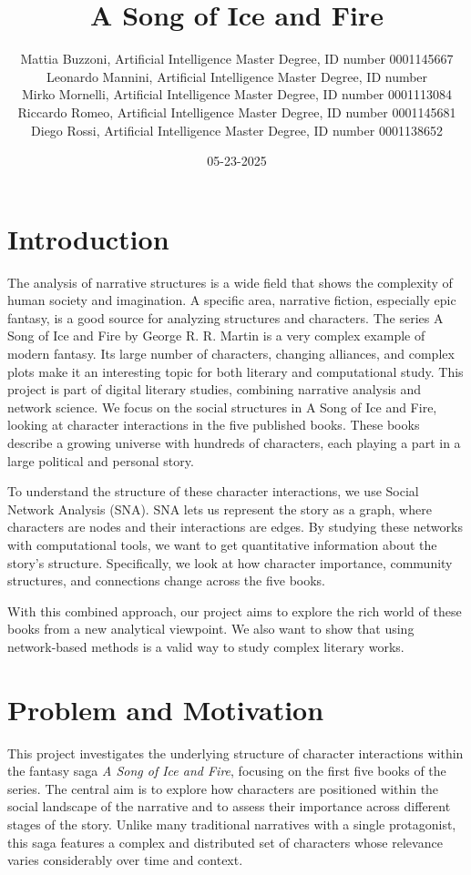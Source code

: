 \documentclass[12pt, a4paper]{article}
\author{Mattia Buzzoni, Artificial Intelligence Master Degree, ID number 0001145667
\\Leonardo Mannini, Artificial Intelligence Master Degree, ID number 
\\Mirko Mornelli, Artificial Intelligence Master Degree, ID number 0001113084
\\Riccardo Romeo, Artificial Intelligence Master Degree, ID number 0001145681
\\Diego Rossi, Artificial Intelligence Master Degree, ID number 0001138652}
\date{05-23-2025}
\title{A Song of Ice and Fire}
\begin{document}
\maketitle

\section{Introduction}
\label{introduction}
The analysis of narrative structures is a wide field that shows the complexity of human society and imagination. A specific area, narrative fiction, especially epic fantasy, is a good source for analyzing structures and characters. The series A Song of Ice and Fire by George R. R. Martin is a very complex example of modern fantasy. Its large number of characters, changing alliances, and complex plots make it an interesting topic for both literary and computational study.
This project is part of digital literary studies, combining narrative analysis and network science. We focus on the social structures in A Song of Ice and Fire, looking at character interactions in the five published books. These books describe a growing universe with hundreds of characters, each playing a part in a large political and personal story.

To understand the structure of these character interactions, we use Social Network Analysis (SNA). SNA lets us represent the story as a graph, where characters are nodes and their interactions are edges. By studying these networks with computational tools, we want to get quantitative information about the story's structure. Specifically, we look at how character importance, community structures, and connections change across the five books.

With this combined approach, our project aims to explore the rich world of these books from a new analytical viewpoint. We also want to show that using network-based methods is a valid way to study complex literary works.

\section{Problem and Motivation}
\label{problem-and-motivation}

This project investigates the underlying structure of character interactions within the fantasy saga \textit{A Song of Ice and Fire}, focusing on the first five books of the series. The central aim is to explore how characters are positioned within the social landscape of the narrative and to assess their importance across different stages of the story. Unlike many traditional narratives with a single protagonist, this saga features a complex and distributed set of characters whose relevance varies considerably over time and context.
\end{document}

